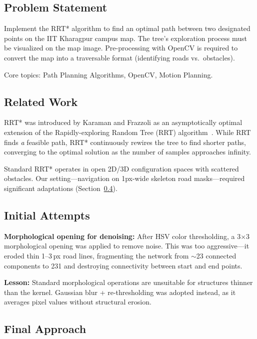 \documentclass[conference,twocolumn]{IEEEtran}
\begin{document}
\subsection{Problem Statement}

Implement the RRT* algorithm to find an optimal path between two designated points on the IIT Kharagpur campus map. The tree's exploration process must be visualized on the map image. Pre-processing with OpenCV is required to convert the map into a traversable format (identifying roads vs.\ obstacles).

Core topics: Path Planning Algorithms, OpenCV, Motion Planning.

\subsection{Related Work}

RRT* was introduced by Karaman and Frazzoli as an asymptotically optimal extension of the Rapidly-exploring Random Tree (RRT) algorithm~\cite{rrt_medium}. While RRT finds \emph{a} feasible path, RRT* continuously rewires the tree to find shorter paths, converging to the optimal solution as the number of samples approaches infinity.

Standard RRT* operates in open 2D/3D configuration spaces with scattered obstacles. Our setting—navigation on 1px-wide skeleton road masks—required significant adaptations (Section~\ref{sec:task1_approach}).

\subsection{Initial Attempts}

\textbf{Morphological opening for denoising:} After HSV color thresholding, a 3$\times$3 morphological opening was applied to remove noise. This was too aggressive—it eroded thin 1--3\,px road lines, fragmenting the network from $\sim$23 connected components to 231 and destroying connectivity between start and end points.

\textbf{Lesson:} Standard morphological operations are unsuitable for structures thinner than the kernel. Gaussian blur + re-thresholding was adopted instead, as it averages pixel values without structural erosion.

\subsection{Final Approach}
\label{sec:task1_approach}
\end{document}
